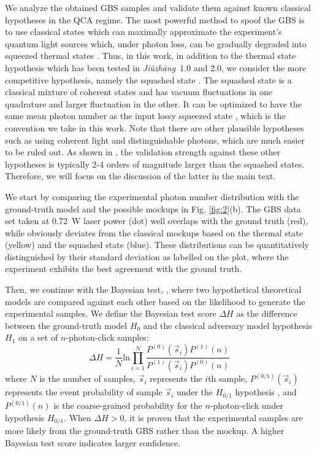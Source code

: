\documentclass[aps,prl,groupedaddress,superscriptaddress,showpacs,reprint,nofootinbib,nolongbibliography]{revtex4-2}
\newcommand{\Jiuzhang}{\textit{Ji\v{u}zh\={a}ng\ }}
\begin{document}
We analyze the obtained GBS samples and validate them against known classical hypotheses in the QCA regime. The most powerful method to spoof the GBS is to use classical states which can maximally approximate the experiment's quantum light sources which, under photon loss, can be gradually degraded into squeezed thermal states \cite{qiRegimesClassicalSimulability2020}. Thus, in this work, in addition to the thermal state hypothesis which has been tested in \Jiuzhang 1.0 and 2.0, we consider the more competitive hypothesis, namely the squashed state \cite{madsenQuantumComputationalAdvantage2022, qiRegimesClassicalSimulability2020}. The squashed state is a classical mixture of coherent states and has vacuum fluctuations in one quadrature and larger fluctuation in the other.
It can be optimized to have the same mean photon number as the input lossy squeezed state \cite{ClassicalModelsAre2022}, which is the convention we take in this work. Note that there are other plausible hypotheses such as using coherent light and distinguishable photons, which are much easier to be ruled out. As shown in \cite{suppl}, the validation strength against these other hypotheses is typically 2-4 orders of magnitude larger than the squashed states. Therefore, we will focus on the discussion of the latter in the main text.

We start by comparing the experimental photon number distribution with the ground-truth model and the possible mockups in Fig. \ref{fig:2}(b). The GBS data set taken at \SI{0.72}{W} laser power (dot) well overlaps with the ground truth (red), while obviously deviates from the classical mockups based on the thermal state (yellow) and the squashed state (blue). These distributions can be quantitatively distinguished by their standard deviation as labelled on the plot, where the experiment exhibits the best agreement with the ground truth.

Then, we continue with the Bayesian test, \cite{bentivegnaBayesianApproachBoson2015}, where two hypothetical theoretical models are compared against each other based on the likelihood to generate the experimental samples. We define the Bayesian test score $\Delta H$ as the difference between the ground-truth model $H_0$ and the classical adversary model hypothesis $H_1$ on a set of $n$-photon-click samples:
\begin{equation}
    \Delta{H}={\frac{1}{N}}\mathrm{ln}\prod_{i=1}^{N}{\frac{{{P}}^{(0)}({\vec{{s}}}_{i}){{P}}^{(1)}(n)}{{P}^{(1)}({\vec{{s}}}_{i}){{P}}^{(0)}(n)}}
\end{equation}
where $N$ is the number of samples, $\vec{s}_i$ represents the $i$th sample, ${P}^{(0/1)}({\vec{{s}}}_{i})$ represents the event probability of sample $\vec{s}_i$ under the $H_{0/1}$ hypothesis , and ${P}^{(0/1)}(n)$ is the coarse-grained probability for the $n$-photon-click under hypothesis $H_{0/1}$. When $\Delta H > 0$, it is proven that the experimental samples are more likely from the ground-truth GBS rather than the mockup. A higher Bayesian test score indicates larger confidence. 
\end{document}
